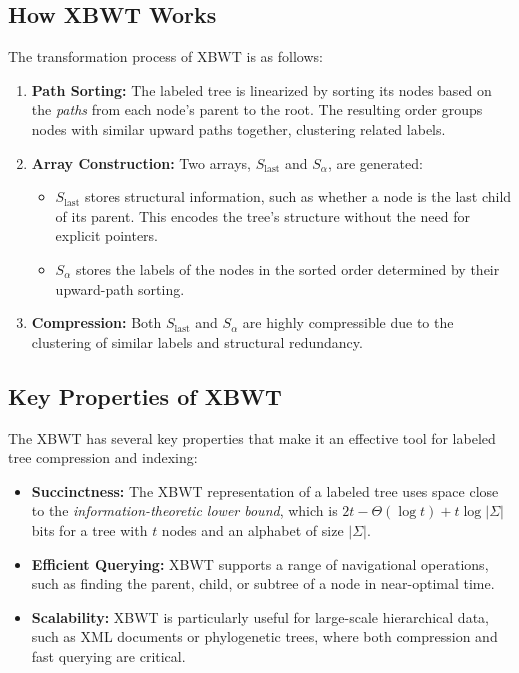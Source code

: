 \subsection{How XBWT Works}
The transformation process of XBWT is as follows:
\begin{enumerate}
    \item \textbf{Path Sorting:} The labeled tree is linearized by sorting its nodes based on the \emph{paths} from each node's parent to the root. The resulting order groups nodes with similar upward paths together, clustering related labels.
    \item \textbf{Array Construction:} Two arrays, \( S_{\text{last}} \) and \( S_{\alpha} \), are generated:
    \begin{itemize}
        \item \( S_{\text{last}} \) stores structural information, such as whether a node is the last child of its parent. This encodes the tree’s structure without the need for explicit pointers.
        \item \( S_{\alpha} \) stores the labels of the nodes in the sorted order determined by their upward-path sorting.
    \end{itemize}
    \item \textbf{Compression:} Both \( S_{\text{last}} \) and \( S_{\alpha} \) are highly compressible due to the clustering of similar labels and structural redundancy.
\end{enumerate}

\subsection{Key Properties of XBWT}
The XBWT has several key properties that make it an effective tool for labeled tree compression and indexing:
\begin{itemize}
    \item \textbf{Succinctness:} The XBWT representation of a labeled tree uses space close to the \emph{information-theoretic lower bound}, which is \( 2t - \Theta(\log t) + t \log |\Sigma| \) bits for a tree with $t$ nodes and an alphabet of size $|\Sigma|$.
    \item \textbf{Efficient Querying:} XBWT supports a range of navigational operations, such as finding the parent, child, or subtree of a node in near-optimal time.
    \item \textbf{Scalability:} XBWT is particularly useful for large-scale hierarchical data, such as XML documents or phylogenetic trees, where both compression and fast querying are critical.
\end{itemize}

